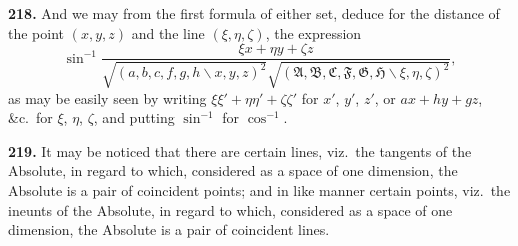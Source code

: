 \documentclass[11pt,a4paper]{article}
\begin{document}
\textbf{218.} And we may from the first formula of either set, deduce for the distance
of the point $(x,y,z)$ and the line $(\xi,\eta,\zeta)$, the expression
\[
\sin^{-1}\frac{\xi x+\eta y+\zeta z}{\sqrt{(a,b,c,f,g,h\!\backslash x,y,z)^2}\sqrt{(\mathfrak{A},\mathfrak{B},\mathfrak{C},\mathfrak{F},\mathfrak{G},\mathfrak{H}\!\backslash \xi,\eta,\zeta)^2}},
\]
as may be easily seen by writing $\xi\xi'+\eta\eta'+\zeta\zeta'$ for $x'$, $y'$, $z'$, or $ax+hy+gz$, \&c.\ for
$\xi$, $\eta$, $\zeta$, and putting $\sin^{-1}$ for $\cos^{-1}$.

\textbf{219.} It may be noticed that there are certain lines, viz.\ the tangents of the
Absolute, in regard to which, considered as a space of one dimension, the Absolute is
a pair of coincident points; and in like manner certain points, viz.\ the ineunts of the
Absolute, in regard to which, considered as a space of one dimension, the Absolute is
a pair of coincident lines.
\end{document}
